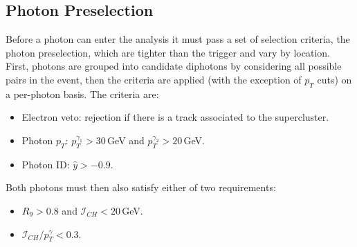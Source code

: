 


\subsection{Photon Preselection}
Before a photon can enter the analysis it must pass a set of selection criteria, the photon preselection, which are tighter than the trigger and vary by location. First, photons are grouped into candidate diphotons by considering all possible pairs in the event, then the criteria are applied (with the exception of $p_{T}$ cuts) on a per-photon basis.
The criteria are:
\begin{itemize}[noitemsep]
    \item Electron veto: rejection if there is a track associated to the supercluster.
    \item Photon $p_{T}$: $p_{T}^{\gamma_1} > 30$\,GeV and $p_{T}^{\gamma_2} > 20$\,GeV.
    \item Photon ID: $\hat{y}>-0.9$.
\end{itemize}
Both photons must then also satisfy either of two requirements:
\begin{itemize}[noitemsep]
    \item $R_{9} > 0.8$ and $\mathcal{I}_{CH} < 20$\,GeV.
    \item $\mathcal{I}_{CH}/p_{T}^{\gamma} < 0.3$.
\end{itemize}
